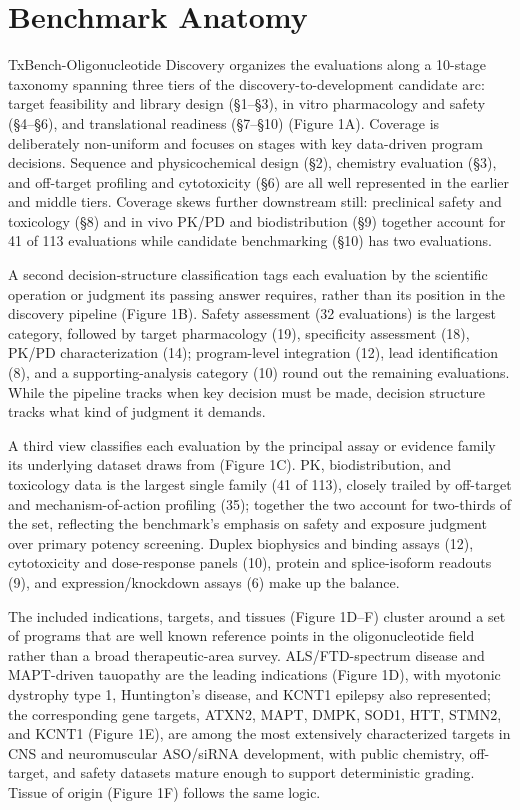 \documentclass[11pt]{article}
\begin{document}
\section{Benchmark Anatomy}
TxBench-Oligonucleotide Discovery organizes the evaluations along a 10-stage taxonomy spanning three tiers of the discovery-to-development candidate arc: target feasibility and library design (\S1--\S3), in vitro pharmacology and safety (\S4--\S6), and translational readiness (\S7--\S10) (Figure 1A). Coverage is deliberately non-uniform and focuses on stages with key data-driven program decisions. Sequence and physicochemical design (\S2), chemistry evaluation (\S3), and off-target profiling and cytotoxicity (\S6) are all well represented in the earlier and middle tiers. Coverage skews further downstream still: preclinical safety and toxicology (\S8) and in vivo PK/PD and biodistribution (\S9) together account for 41 of 113 evaluations while candidate benchmarking (\S10) has two evaluations.

A second decision-structure classification tags each evaluation by the scientific operation or judgment its passing answer requires, rather than its position in the discovery pipeline (Figure 1B). Safety assessment (32 evaluations) is the largest category, followed by target pharmacology (19), specificity assessment (18), PK/PD characterization (14); program-level integration (12), lead identification (8), and a supporting-analysis category (10) round out the remaining evaluations. While the pipeline tracks when key decision must be made, decision structure tracks what kind of judgment it demands.

A third view classifies each evaluation by the principal assay or evidence family its underlying dataset draws from (Figure 1C). PK, biodistribution, and toxicology data is the largest single family (41 of 113), closely trailed by off-target and mechanism-of-action profiling (35); together the two account for two-thirds of the set, reflecting the benchmark's emphasis on safety and exposure judgment over primary potency screening. Duplex biophysics and binding assays (12), cytotoxicity and dose-response panels (10), protein and splice-isoform readouts (9), and expression/knockdown assays (6) make up the balance.

The included indications, targets, and tissues (Figure 1D--F) cluster around a set of programs that are well known reference points in the oligonucleotide field rather than a broad therapeutic-area survey. ALS/FTD-spectrum disease and MAPT-driven tauopathy are the leading indications (Figure 1D), with myotonic dystrophy type 1, Huntington's disease, and KCNT1 epilepsy also represented; the corresponding gene targets, ATXN2, MAPT, DMPK, SOD1, HTT, STMN2, and KCNT1 (Figure 1E), are among the most extensively characterized targets in CNS and neuromuscular ASO/siRNA development, with public chemistry, off-target, and safety datasets mature enough to support deterministic grading. Tissue of origin (Figure 1F) follows the same logic.
\end{document}
